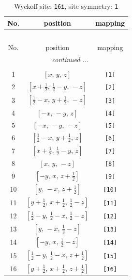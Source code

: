 \documentclass[fleqn,8pt]{jsarticle}
\begin{document}
\begin{longtable}{ccc}
\caption{Wyckoff site: {\tt 16i}, site symmetry: {\tt 1}}
 \\
 \hline \hline
No. & position & mapping \\ \hline \endfirsthead

\multicolumn{2}{l}{\tablename\ \thetable{}} \\
 \hline \hline
No. & position & mapping \\ \hline \endhead

 \hline \hline
\multicolumn{2}{r}{\footnotesize\it continued ...} \\ \endfoot

 \hline \hline
\multicolumn{2}{r}{} \\ \endlastfoot

1 & $\left[ x,\, y,\, z \right]$ & {\tt [1]} \\ \hline
2 & $\left[ x + \frac{1}{2},\, \frac{1}{2} - y,\, - z \right]$ & {\tt [2]} \\ \hline
3 & $\left[ \frac{1}{2} - x,\, y + \frac{1}{2},\, - z \right]$ & {\tt [3]} \\ \hline
4 & $\left[ - x,\, - y,\, z \right]$ & {\tt [4]} \\ \hline
5 & $\left[ - x,\, - y,\, - z \right]$ & {\tt [5]} \\ \hline
6 & $\left[ \frac{1}{2} - x,\, y + \frac{1}{2},\, z \right]$ & {\tt [6]} \\ \hline
7 & $\left[ x + \frac{1}{2},\, \frac{1}{2} - y,\, z \right]$ & {\tt [7]} \\ \hline
8 & $\left[ x,\, y,\, - z \right]$ & {\tt [8]} \\ \hline
9 & $\left[ - y,\, x,\, z + \frac{1}{2} \right]$ & {\tt [9]} \\ \hline
10 & $\left[ y,\, - x,\, z + \frac{1}{2} \right]$ & {\tt [10]} \\ \hline
11 & $\left[ y + \frac{1}{2},\, x + \frac{1}{2},\, \frac{1}{2} - z \right]$ & {\tt [11]} \\ \hline
12 & $\left[ \frac{1}{2} - y,\, \frac{1}{2} - x,\, \frac{1}{2} - z \right]$ & {\tt [12]} \\ \hline
13 & $\left[ y,\, - x,\, \frac{1}{2} - z \right]$ & {\tt [13]} \\ \hline
14 & $\left[ - y,\, x,\, \frac{1}{2} - z \right]$ & {\tt [14]} \\ \hline
15 & $\left[ \frac{1}{2} - y,\, \frac{1}{2} - x,\, z + \frac{1}{2} \right]$ & {\tt [15]} \\ \hline
16 & $\left[ y + \frac{1}{2},\, x + \frac{1}{2},\, z + \frac{1}{2} \right]$ & {\tt [16]} \\
\end{longtable}
\end{document}
